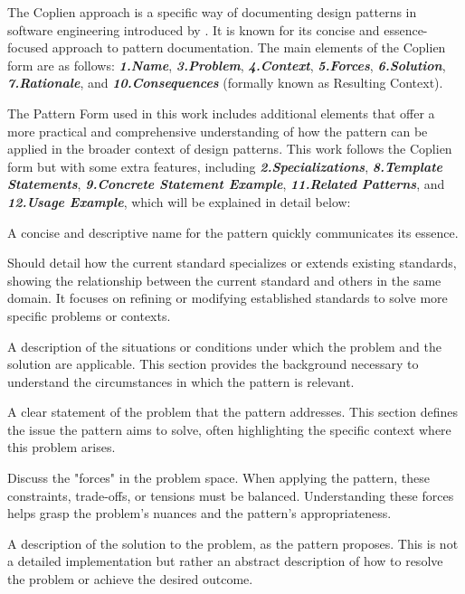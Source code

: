 The Coplien approach is a specific way of documenting design patterns in software engineering introduced by \textcite{coplien1995generative}. It is known for its concise and essence-focused approach to pattern documentation. The main elements of the Coplien form are as follows: \textbf{\textit{1.Name}}, \textbf{\textit{ 3.Problem}}, \textbf{\textit{4.Context}}, \textbf{\textit{5.Forces}}, \textbf{\textit{6.Solution}}, \textbf{\textit{7.Rationale}}, and \textbf{\textit{10.Consequences}} (formally known as Resulting Context).

The Pattern Form used in this work includes additional elements that offer a more practical and comprehensive understanding of how the pattern can be applied in the broader context of design patterns. This work follows the Coplien form but with some extra features, including \textbf{\textit{2.Specializations}}, \textbf{\textit{8.Template Statements}}, \textbf{\textit{9.Concrete Statement Example}}, \textbf{\textit{11.Related Patterns}}, and \textbf{\textit{12.Usage Example}}, which will be explained in detail below:

 A concise and descriptive name for the pattern quickly communicates its essence.

 Should detail how the current standard specializes or extends existing standards, showing the relationship between the current standard and others in the same domain. It focuses on refining or modifying established standards to solve more specific problems or contexts.

 A description of the situations or conditions under which the problem and the solution are applicable. This section provides the background necessary to understand the circumstances in which the pattern is relevant.

 A clear statement of the problem that the pattern addresses. This section defines the issue the pattern aims to solve, often highlighting the specific context where this problem arises.

 Discuss the "forces" in the problem space. When applying the pattern, these constraints, trade-offs, or tensions must be balanced. Understanding these forces helps grasp the problem's nuances and the pattern's appropriateness.

 A description of the solution to the problem, as the pattern proposes. This is not a detailed implementation but rather an abstract description of how to resolve the problem or achieve the desired outcome.

